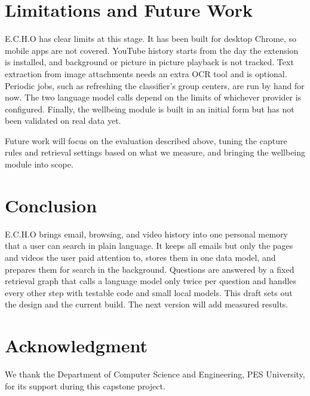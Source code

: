 \documentclass[conference]{IEEEtran}
\begin{document}
\section{Limitations and Future Work}\label{sec:limits}
E.C.H.O has clear limits at this stage. It has been built for desktop Chrome, so mobile apps are not covered. YouTube history starts from the day the extension is installed, and background or picture in picture playback is not tracked. Text extraction from image attachments needs an extra OCR tool and is optional. Periodic jobs, such as refreshing the classifier's group centers, are run by hand for now. The two language model calls depend on the limits of whichever provider is configured. Finally, the wellbeing module is built in an initial form but has not been validated on real data yet.

Future work will focus on the evaluation described above, tuning the capture rules and retrieval settings based on what we measure, and bringing the wellbeing module into scope.

\section{Conclusion}\label{sec:conc}
E.C.H.O brings email, browsing, and video history into one personal memory that a user can search in plain language. It keeps all emails but only the pages and videos the user paid attention to, stores them in one data model, and prepares them for search in the background. Questions are answered by a fixed retrieval graph that calls a language model only twice per question and handles every other step with testable code and small local models. This draft sets out the design and the current build. The next version will add measured results.

\section*{Acknowledgment}
We thank the Department of Computer Science and Engineering, PES University, for its support during this capstone project.
\end{document}
